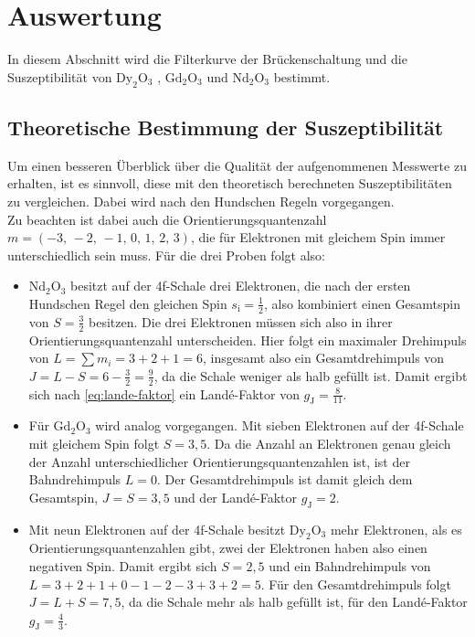 \section{Auswertung}
\label{sec:Auswertung}
In diesem Abschnitt wird die Filterkurve der Brückenschaltung und die Suszeptibilität von $\text{Dy}_2\text{O}_3$ , $\text{Gd}_2\text{O}_3$ und  $\text{Nd}_2 \text{O}_3$ bestimmt.

\subsection{Theoretische Bestimmung der Suszeptibilität}

Um einen besseren Überblick über die Qualität der aufgenommenen Messwerte zu erhalten, ist es sinnvoll, diese mit den theoretisch berechneten Suszeptibilitäten zu vergleichen.
Dabei wird nach den Hundschen Regeln vorgegangen. \\

Zu beachten ist dabei auch die Orientierungsquantenzahl $m = (-3, \,-2, \,-1, \,0, \,1, \,2, \,3)$, die für Elektronen mit gleichem Spin immer unterschiedlich sein muss.
Für die drei Proben folgt also:

\begin{itemize}
    \item $\text{Nd}_2 \text{O}_3$ besitzt auf der 4f-Schale drei Elektronen, die nach der ersten Hundschen Regel den gleichen Spin $s_\text{i} = \frac{1}{2}$, also kombiniert einen Gesamtspin von $S = \frac{3}{2}$ besitzen.
          Die drei Elektronen müssen sich also in ihrer Orientierungsquantenzahl unterscheiden. 
          Hier folgt ein maximaler Drehimpuls von $L = \sum m_i = 3 + 2 + 1 = 6$, insgesamt also ein Gesamtdrehimpuls von $J = L - S = 6 - \frac{3}{2} = \frac{9}{2}$,
          da die Schale weniger als halb gefüllt ist.
          Damit ergibt sich nach \eqref{eq:lande-faktor} ein Landé-Faktor von $g_\text{J} = \frac{8}{11}$.

    \item Für $\text{Gd}_2\text{O}_3$ wird analog vorgegangen. Mit sieben Elektronen auf der 4f-Schale mit gleichem Spin folgt $S = 3,5$. 
        Da die Anzahl an Elektronen genau gleich der Anzahl unterschiedlicher Orientierungsquantenzahlen ist, ist der Bahndrehimpuls $L = 0$.
        Der Gesamtdrehimpuls ist damit gleich dem Gesamtspin, $J = S = 3,5$ und der Landé-Faktor $g_\text{J} = 2$.

    \item Mit neun Elektronen auf der 4f-Schale besitzt $\text{Dy}_2\text{O}_3$ mehr Elektronen, als es Orientierungsquantenzahlen gibt, zwei der Elektronen haben also einen negativen Spin.
        Damit ergibt sich $S = 2,5$ und ein Bahndrehimpuls von \\ $L = 3 + 2 + 1 + 0 - 1 - 2 - 3 + 3 + 2 = 5$.
        Für den Gesamtdrehimpuls folgt $J = L + S = 7,5$, da die Schale mehr als halb gefüllt ist, für den Landé-Faktor $g_\text{J} = \frac{4}{3}$.
\end{itemize}

